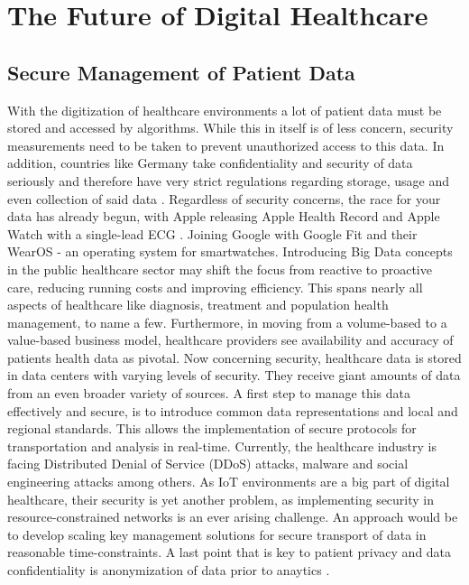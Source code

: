 \section{The Future of Digital Healthcare}
\subsection{Secure Management of Patient Data}
With the digitization of healthcare environments a lot of patient data must be stored and accessed by algorithms. While this in itself is of less concern, security measurements need to be taken to prevent unauthorized access to this data. In addition, countries like Germany take confidentiality and security of data seriously and therefore have very strict regulations regarding storage, usage and even collection of said data \cite{dsgvo}. Regardless of security concerns, the race for your data has already begun, with Apple releasing Apple Health Record and Apple Watch with a single-lead ECG \cite{appleHealth}. Joining Google with Google Fit and their WearOS - an operating system for smartwatches. Introducing Big Data concepts in the public healthcare sector may shift the focus from reactive to proactive care, reducing running costs and improving efficiency. This spans nearly all aspects of healthcare like diagnosis, treatment and population health management, to name a few. Furthermore, in moving from a volume-based to a value-based business model, healthcare providers see availability and accuracy of patients health data as pivotal. Now concerning security, healthcare data is stored in data centers with varying levels of security. They receive giant amounts of data from an even broader variety of sources. A first step to manage this data effectively and secure, is to introduce common data representations and local and regional standards. This allows the implementation of secure protocols for transportation and analysis in real-time. Currently, the healthcare industry is facing Distributed Denial of Service (DDoS) attacks, malware and social engineering attacks among others. As IoT environments are a big part of digital healthcare, their security is yet another problem, as implementing security in resource-constrained networks is an ever arising challenge. An approach would be to develop scaling key management solutions for secure transport of data in reasonable time-constraints. A last point that is key to patient privacy and data confidentiality is anonymization of data prior to anaytics \cite{patil2014big}.
